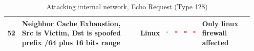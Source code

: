 \documentclass[12pt]{article}
\begin{document}
\begin{savenotes}
\begin{table}[!h]
{{\begin{tabular}{|C{1.0cm}|L{6.0cm}|C{1.5cm}|C{1.0cm}|C{1.0cm}|C{1.0cm}|C{1.0cm}|L{7.0cm}|}
52&Neighbor Cache Exhaustion, Src is Victim, Dst is spoofed prefix /64 plus 16 bits range&Linux&\includegraphics[width=4mm, height=4mm]{ok}&\includegraphics[width=4mm, height=4mm]{notok}&\includegraphics[width=4mm, height=4mm]{notok}&\includegraphics[width=4mm, height=4mm]{notok}&Only linux firewall affected\\
\hline
\end{tabular}}}
\caption{Attacking internal network, Echo Request (Type 128)}
\label{table:attackInternalResults5}
\end{table}
\end{savenotes}
\end{document}
